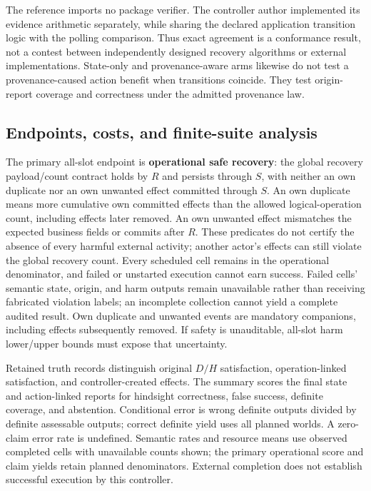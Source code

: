 \documentclass[conference]{IEEEtran}
\begin{document}
The reference imports no package verifier. The controller author implemented its evidence arithmetic separately, while sharing the declared application transition logic with the polling comparison. Thus exact agreement is a conformance result, not a contest between independently designed recovery algorithms or external implementations. State-only and provenance-aware arms likewise do not test a provenance-caused action benefit when transitions coincide. They test origin-report coverage and correctness under the admitted provenance law.

\subsection{Endpoints, costs, and finite-suite analysis}

The primary all-slot endpoint is \textbf{operational safe recovery}: the global recovery payload/count contract holds by $R$ and persists through $S$, with neither an own duplicate nor an own unwanted effect committed through $S$. An own duplicate means more cumulative own committed effects than the allowed logical-operation count, including effects later removed. An own unwanted effect mismatches the expected business fields or commits after $R$. These predicates do not certify the absence of every harmful external activity; another actor's effects can still violate the global recovery count. Every scheduled cell remains in the operational denominator, and failed or unstarted execution cannot earn success. Failed cells' semantic state, origin, and harm outputs remain unavailable rather than receiving fabricated violation labels; an incomplete collection cannot yield a complete audited result. Own duplicate and unwanted events are mandatory companions, including effects subsequently removed. If safety is unauditable, all-slot harm lower/upper bounds must expose that uncertainty.

Retained truth records distinguish original $D/H$ satisfaction, operation-linked satisfaction, and controller-created effects. The summary scores the final state and action-linked reports for hindsight correctness, false success, definite coverage, and abstention. Conditional error is wrong definite outputs divided by definite assessable outputs; correct definite yield uses all planned worlds. A zero-claim error rate is undefined. Semantic rates and resource means use observed completed cells with unavailable counts shown; the primary operational score and claim yields retain planned denominators. External completion does not establish successful execution by this controller.
\end{document}
